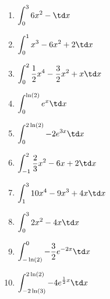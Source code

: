 \begin{Exercise}[title={\raggedright\normalfont Berechne die Werte, der in Aufgabe \ref{integralGrafisch1} abgeschätzen Integrale, exakt.}, label=integralRechnA1]\\
\end{Exercise}
\begin{Exercise}[title={\raggedright\normalfont Berechne die Werte der folgenden Integrale:}, label=integralRechnA2]\\
	\begin{minipage}{\textwidth}
		\begin{minipage}{.5\textwidth}
			\begin{enumerate}[label=\alph*)]
				\item \(\displaystyle\int_{0}^{3} 6x^2- \td x\)
				\item \(\displaystyle\int_{0}^{1} x^3-6x^2+2 \td x\)
				\item \(\displaystyle\int_{0}^{2} \frac{1}{2}x^4-\frac{3}{2}x^2+x \td x\)
				\item \(\displaystyle\int_{0}^{\ln(2)} e^x \td x\)
				\item \(\displaystyle\int_{0}^{2\ln(2)} -2e^{3x} \td x\)
			\end{enumerate}
		\end{minipage}
		\begin{minipage}{.5\textwidth}
			\begin{enumerate}[label=\alph*)]
				\setcounter{enumi}{5}
				\item \(\displaystyle\int_{-1}^{2} \frac{2}{3}x^2-6x+2 \td x\)
				\item \(\displaystyle\int_{1}^{3} 10x^4-9x^3+4x \td x\)
				\item \(\displaystyle\int_{0}^{3} 2x^2-4x \td x\)
				\item \(\displaystyle\int_{-\ln(2)}^{0} -\frac{3}{2}e^{-2x} \td x\)
				\item \(\displaystyle\int_{-2\ln(3)}^{2\ln(2)} -4e^{\frac{1}{2}x} \td x\)
			\end{enumerate}
		\end{minipage}
	\end{minipage}
	
\end{Exercise}

